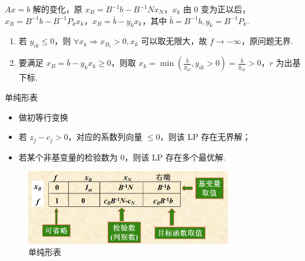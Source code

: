 \begin{remark}
\begin{itemize}
            $Ax = b$ 解的变化，原 $x_B = B^{-1}b - B^{-1}Nx_N$，$x_k$ 由 0 变为正以后，$x_B = B^{-1}b - B^{-1}P_kx_k$，$x_B = \bar{b}-y_{k} x_{k}$，其中 $\bar{b} = B^{-1}b,y_k = B^{-1}P_k$.
            \begin{enumerate}
                \item 若 $y_{ik}\le 0$，则 $\forall x_k \Longrightarrow x_{B_i} > 0,x_k$ 可以取无限大，故 $f\to -\infty$，原问题无界.
                \item 要满足 $x_B = \bar{b}-y_{k} x_{k} \ge 0$，则取 $x_k = \min(\frac{\bar{b}}{y_{ik}},y_{ik}>0) = \frac{\bar{b}}{y_{rk}} > 0$，$r$ 为出基下标.
            \end{enumerate}
    \end{itemize}
\end{remark}

\begin{remark}
    单纯形表
    \begin{itemize}
        \item 做初等行变换
        \item 若 $z_j - c_j > 0$，对应的系数列向量 $\le 0$，则该 LP 存在无界解；
        \item 若某个非基变量的检验数为 0，则该 LP 存在多个最优解.
    \end{itemize}
    \begin{figure}[htbp]
        \centering
        \includegraphics[width=0.8\textwidth]{./figures/img1.png}
        \caption{单纯形表 \label{fig1}}
    \end{figure}
\end{remark}

